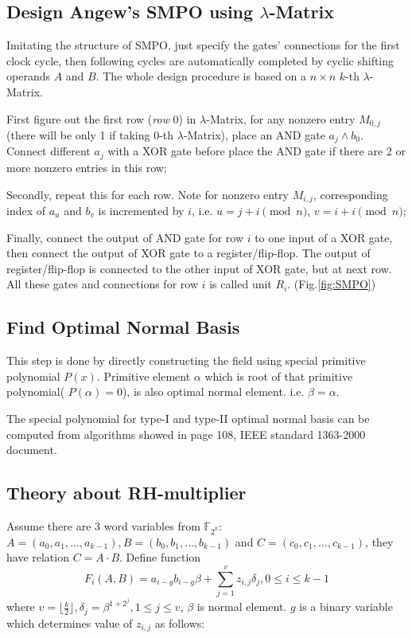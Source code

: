 \subsection{Design Angew's SMPO using $\lambda$-Matrix}
Imitating the structure of SMPO, just specify the gates' connections for the first clock cycle, then following cycles are
automatically completed by cyclic shifting operands $A$ and $B$. The whole design procedure is based on a $n \times n$ $k$-th $\lambda$-Matrix.

First figure out the first row (\emph{row} 0) in $\lambda$-Matrix, for any nonzero entry $M_{0,j}$ (there will be only 1 if taking $0$-th $\lambda$-Matrix), place an AND gate
$a_j\land b_0$. Connect different $a_j$ with a XOR gate before place the AND gate if there are 2 or more nonzero entries in this row;

Secondly, repeat this for each row. Note for nonzero entry $M_{i,j}$, corresponding index of $a_u$ and $b_v$ is incremented by $i$, i.e. $u = j + i \pmod n$, $v = i + i \pmod n$;

Finally, connect the output of AND gate for row $i$ to one input of a XOR gate, then connect the output of XOR gate to a register/flip-flop. The output of register/flip-flop is connected
to the other input of XOR gate, but at next row. All these gates and connections for row $i$ is called unit $R_i$. (Fig.\ref{fig:SMPO})

\subsection{Find Optimal Normal Basis}
This step is done by directly constructing the field using special primitive polynomial $P(x)$. Primitive element $\alpha$ which is root of that primitive polynomial( $P(\alpha)=0$),
is also optimal normal element. i.e. $\beta = \alpha$.

The special polynomial for type-I and type-II optimal normal basis can be computed from algorithms showed in page 108, IEEE standard 1363-2000 document.

\subsection{Theory about RH-multiplier}
\label{sec:RHmulti}
Assume there are 3 word variables from $\mathbb F_{2^k}$: $A = (a_0,a_1,\dots,a_{k-1}), B = (b_0,b_1,\dots,b_{k-1})$
and $C = (c_0,c_1,\dots,c_{k-1})$, they have relation $C = A\cdot B$. Define function
$$F_i(A,B) = a_{i-g}b_{i-g}\beta +\sum_{j=1}^{v}z_{i,j}\delta_j, 0\leq i\leq k-1$$
where $v = \lfloor \frac{k}{2}\rfloor, \delta_j = \beta^{1+2^j}, 1\leq j\leq v$, $\beta$ is normal element.
$g$ is a binary variable which determines value of $z_{i,j}$ as follows:

